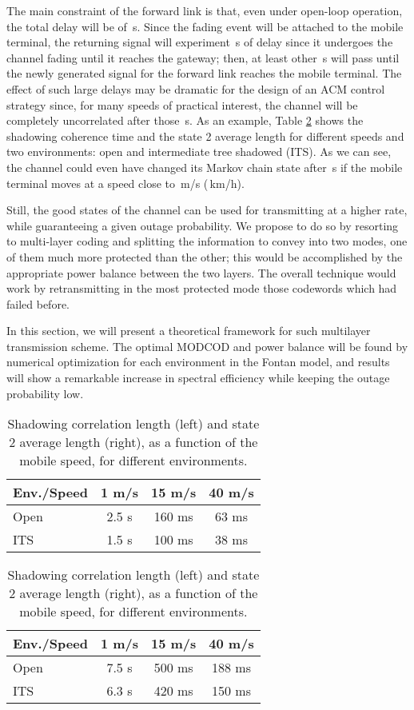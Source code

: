 \documentclass[journal,onecolumn,10pt,a4paper]{IEEEtran}
\begin{document}
The main constraint of the forward link is that, even under open-loop operation, the total delay will be of \,s. Since the fading event will be attached to the mobile terminal, the returning signal will experiment \,s of delay since it undergoes the channel fading until it reaches the gateway; then, at least other \,s will pass until the newly generated signal for the forward link reaches the mobile terminal. The effect of such large delays may be dramatic for the design of an ACM control strategy since, for many speeds of practical interest, the channel will be completely uncorrelated after those \,s. As an example, Table \ref{tbl:sh_corr} shows the shadowing coherence time and the state 2 average length for different speeds and two environments: open and intermediate tree shadowed (ITS). As we can see, the channel could even have changed its Markov chain state after \,s if the mobile terminal moves at a speed close to \,m/s (\,km/h).

Still, the good states of the channel can be used for transmitting at a higher rate, while guaranteeing a given outage probability. We propose to do so by resorting to multi-layer coding and splitting the information
to convey into two modes, one of them much more protected than the other; this would
be accomplished by the appropriate power balance between the two layers. The overall technique
would work by retransmitting in the most protected mode those codewords which had
failed before. 

In this section, we will present a theoretical framework for such multilayer transmission scheme. The optimal MODCOD and power balance will be found by numerical optimization for each environment in the Fontan model, and results will show a remarkable increase in spectral efficiency while keeping the outage probability low.
\begin{table}
  \caption{Shadowing correlation length (left) and state 2 average length (right), as a function of the mobile speed, for different environments.}
  \label{tbl:sh_corr}

  \centering
  \begin{tabular}{|l | c | c | c |} \hline
Env./Speed & 1 m/s & 15 m/s & 40 m/s \\ \hline
Open	& 2.5 s & 160 ms & 63 ms \\ \hline
ITS	& 1.5 s & 100 ms & 38 ms \\ \hline

  \end{tabular}\hspace*{1cm}
  \begin{tabular}{|l | c | c | c |} \hline
Env./Speed & 1 m/s & 15 m/s & 40 m/s \\ \hline
Open	& 7.5 s & 500 ms & 188 ms \\ \hline
ITS	& 6.3 s & 420 ms & 150 ms \\ \hline

  \end{tabular}
\end{table}
 \newcommand{\doc}{report }
\newcommand{\Lalb}{{\cal L} }
\newcommand{\Halb}{{\cal H} }
\newcommand{\malb}[1]{\boldsymbol{\mathbf{#1}}}
\end{document}
